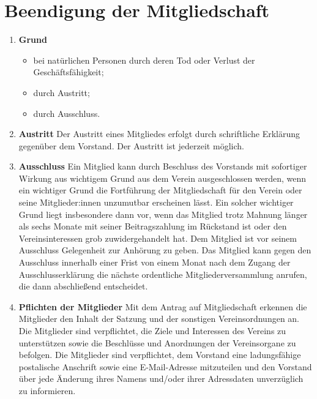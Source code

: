 \documentclass{scrartcl}
\begin{document}
    \section{Beendigung der Mitgliedschaft}
        \begin{enumerate}
            \item \textbf{Grund}
                \begin{itemize}
                    \item bei natürlichen Personen durch deren Tod oder Verlust der Geschäftsfähigkeit;
                    \item durch Austritt;
                    \item durch Ausschluss.
                \end{itemize}
            \item \textbf{Austritt} \newline
                Der Austritt eines Mitgliedes erfolgt durch schriftliche Erklärung gegenüber dem
                Vorstand. Der Austritt ist jederzeit möglich.
            \item \textbf{Ausschluss} \newline
                Ein Mitglied kann durch Beschluss des Vorstands mit sofortiger Wirkung aus
                wichtigem Grund aus dem Verein ausgeschlossen werden, wenn ein wichtiger Grund die
                Fortführung der Mitgliedschaft für den Verein oder seine Mitglieder:innen unzumutbar
                erscheinen lässt.
                Ein solcher wichtiger Grund liegt insbesondere dann vor, wenn das Mitglied trotz Mahnung
                länger als sechs Monate mit seiner Beitragszahlung im Rückstand ist oder den
                Vereinsinteressen grob zuwidergehandelt hat.
                Dem Mitglied ist vor seinem Ausschluss Gelegenheit zur Anhörung zu geben.
                Das Mitglied kann gegen den Ausschluss innerhalb einer Frist von einem Monat nach dem
                Zugang der Ausschlusserklärung die nächste ordentliche Mitgliederversammlung anrufen,
                die dann abschließend entscheidet.
            \item \textbf{Pflichten der Mitglieder} \newline
                Mit dem Antrag auf Mitgliedschaft erkennen die Mitglieder den Inhalt der Satzung und der
                sonstigen Vereinsordnungen an. Die Mitglieder sind verpflichtet, die Ziele und Interessen des
                Vereins zu unterstützen sowie die Beschlüsse und Anordnungen der Vereinsorgane zu
                befolgen.
                Die Mitglieder sind verpflichtet, dem Vorstand eine ladungsfähige postalische Anschrift sowie
                eine E-Mail-Adresse mitzuteilen und den Vorstand über jede Änderung ihres Namens und/oder
                ihrer Adressdaten unverzüglich zu informieren.
        \end{enumerate}
\end{document}
